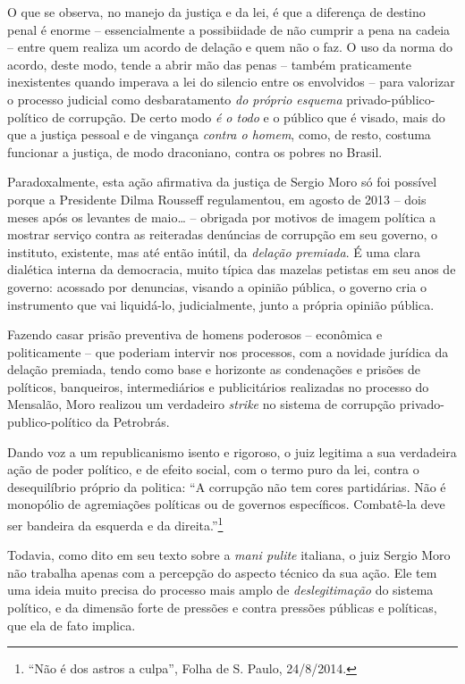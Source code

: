O que se observa, no manejo da justiça e da lei, é que a diferença de
destino penal é enorme -- essencialmente a possibiidade de não cumprir a
pena na cadeia -- entre quem realiza um acordo de delação e quem não o
faz. O uso da norma do acordo, deste modo, tende a abrir mão das penas
-- também praticamente inexistentes quando imperava a lei do silencio
entre os envolvidos -- para valorizar o processo judicial como
desbaratamento \emph{do próprio esquema} privado-público-político de
corrupção. De certo modo \emph{é o todo} e o público que é visado, mais
do que a justiça pessoal e de vingança \emph{contra o homem}, como, de
resto, costuma funcionar a justiça, de modo draconiano, contra os pobres
no Brasil.

Paradoxalmente, esta ação afirmativa da justiça de Sergio Moro só foi
possível porque a Presidente Dilma Rousseff regulamentou, em agosto de
2013 -- dois meses após os levantes de maio… -- obrigada por motivos
de imagem política a mostrar serviço contra as reiteradas denúncias de
corrupção em seu governo, o instituto, existente, mas até então inútil,
da \emph{delação premiada}. É uma clara dialética interna da democracia,
muito típica das mazelas petistas em seu anos de governo: acossado por
denuncias, visando a opinião pública, o governo cria o instrumento que
vai liquidá-lo, judicialmente, junto a própria opinião pública.

Fazendo casar prisão preventiva de homens poderosos -- econômica e
politicamente -- que poderiam intervir nos processos, com a novidade
jurídica da delação premiada, tendo como base e horizonte as condenações
e prisões de políticos, banqueiros, intermediários e publicitários
realizadas no processo do Mensalão, Moro realizou um verdadeiro
\emph{strike} no sistema de corrupção privado-publico-político da
Petrobrás.

Dando voz a um republicanismo isento e rigoroso, o juiz legitima a sua
verdadeira ação de poder político, e de efeito social, com o termo puro
da lei, contra o desequilíbrio próprio da politica: ``A corrupção não
tem cores partidárias. Não é monopólio de agremiações políticas ou de
governos específicos. Combatê-la deve ser bandeira da esquerda e da
direita.''\footnote{``Não é dos astros a culpa'', Folha de S. Paulo,
  24/8/2014.}

Todavia, como dito em seu texto sobre a \emph{mani pulite} italiana, o
juiz Sergio Moro não trabalha apenas com a percepção do aspecto técnico
da sua ação. Ele tem uma ideia muito precisa do processo mais amplo de
\emph{deslegitimação} do sistema político, e da dimensão forte de
pressões e contra pressões públicas e políticas, que ela de fato
implica.

